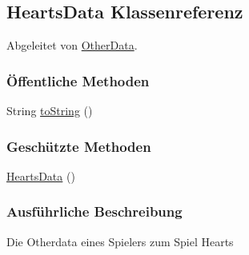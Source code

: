 \hypertarget{a00063}{\subsection{Hearts\-Data Klassenreferenz}
\label{a00063}
}


Abgeleitet von \hyperlink{a00064}{Other\-Data}.

\subsubsection*{Öffentliche Methoden}
\begin{DoxyCompactItemize}
\item 
\hypertarget{a00063_ad146fa8579a5f8a876c4688cc5a68520}{String \hyperlink{a00063_ad146fa8579a5f8a876c4688cc5a68520}{to\-String} ()}\label{a00063_ad146fa8579a5f8a876c4688cc5a68520}

\end{DoxyCompactItemize}
\subsubsection*{Geschützte Methoden}
\begin{DoxyCompactItemize}
\item 
\hypertarget{a00063_af0ad8b0f236fb4d365c30e384cf6b185}{\hyperlink{a00063_af0ad8b0f236fb4d365c30e384cf6b185}{Hearts\-Data} ()}\label{a00063_af0ad8b0f236fb4d365c30e384cf6b185}

\end{DoxyCompactItemize}


\subsubsection{Ausführliche Beschreibung}
Die Otherdata eines Spielers zum Spiel Hearts 